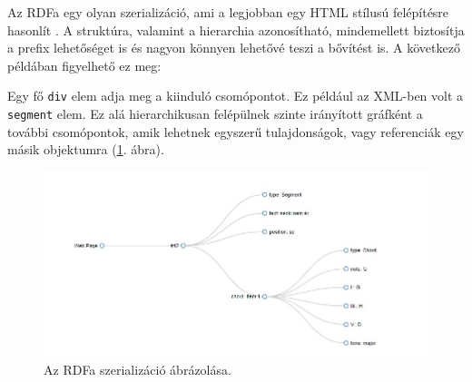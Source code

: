 
Az RDFa egy olyan szerializáció, ami a legjobban egy HTML stílusú felépítésre hasonlít \cite{rdfa_with_example}. A struktúra, valamint a hierarchia azonosítható, mindemellett biztosítja a prefix lehetőséget is és nagyon könnyen lehetővé teszi a bővítést is. A következő példában figyelhető ez meg:

Egy fő \texttt{div} elem adja meg a kiinduló csomópontot. Ez például az XML-ben volt a \texttt{segment} elem. Ez alá hierarchikusan felépülnek szinte irányított gráfként a további csomópontok, amik lehetnek egyszerű tulajdonságok, vagy referenciák egy másik objektumra (\ref{fig:rdfa}. ábra).

\begin{figure}[h]
	\includegraphics[scale=0.8]{images/misc/RDFa_serialization_example.jpg}
	\caption{Az RDFa szerializáció ábrázolása.}
	\label{fig:rdfa}
\end{figure}



